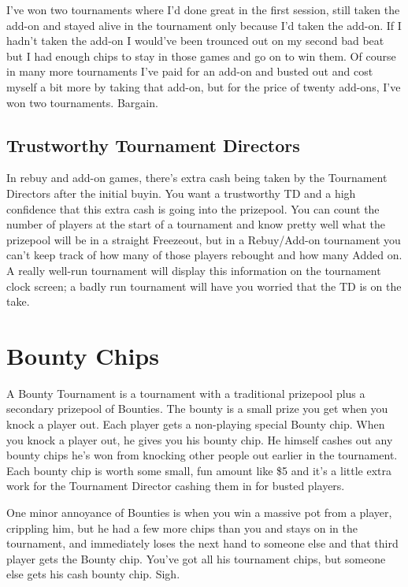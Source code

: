 I've won two tournaments where I'd done great in the first session,
still taken the add-on and stayed alive in the tournament only because
I'd taken the add-on. If I hadn't taken the add-on I would've been
trounced out on my second bad beat but I had enough chips to stay in
those games and go on to win them. Of course in many more tournaments
I've paid for an add-on and busted out and cost myself a bit more by
taking that add-on, but for the price of twenty add-ons, I've won two
tournaments. Bargain.

\subsection*{Trustworthy Tournament Directors}

In rebuy and add-on games, there's extra cash being taken by
the Tournament Directors after the initial buyin. You want
a trustworthy TD and a high confidence that this extra cash is
going into the prizepool. You can count the number of players
at the start of a tournament and know pretty well what the prizepool
will be in a straight Freezeout, but in a Rebuy/Add-on tournament
you can't keep track of how many of those players rebought and how
many Added on. A really well-run tournament will display this
information on the tournament clock screen; a badly run tournament
will have you worried that the TD is on the take.

\section{Bounty Chips}

A Bounty Tournament is a tournament with a traditional prizepool
plus a secondary prizepool of Bounties. The bounty
is a small prize you get when you knock a player out.
Each player gets a non-playing special Bounty chip.
When you knock a player out, he gives you his bounty chip.
He himself cashes out any bounty chips he's won from knocking
other people out earlier in the tournament. Each bounty chip is worth
some small, fun amount like \$5 and it's a little extra work for the
Tournament Director cashing them in for busted players.

One minor annoyance of Bounties is when you win a massive pot
from a player, crippling him, but he had a few more chips than
you and stays on in the tournament, and immediately loses the
next hand to someone else and that third player gets the
Bounty chip. You've got all his tournament chips, but someone
else gets his cash bounty chip. Sigh.

